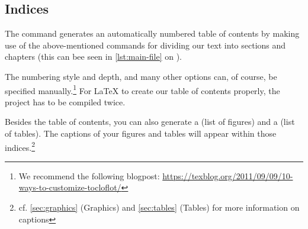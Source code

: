 
\subsection{Indices}\label{sec:table-of-contents}

The command  generates an automatically numbered table of contents by making use of the above-mentioned commands for dividing our text into sections and chapters (this can bee seen in \cref{lst:main-file} on ).

The numbering style and depth, and many other options can, of course, be specified manually.\footnote{We recommend the following blogpost: \url{https://texblog.org/2011/09/09/10-ways-to-customize-tocloflot/}}
For \LaTeX{} to create our table of contents properly, the project has to be compiled twice.

Besides the table of contents, you can also generate a  (list of figures) and a  (list of tables). 
The captions of your figures and tables will appear within those indices.\footnote{cf. \cref{sec:graphics} (Graphics) and \cref{sec:tables} (Tables) for more information on captions}
